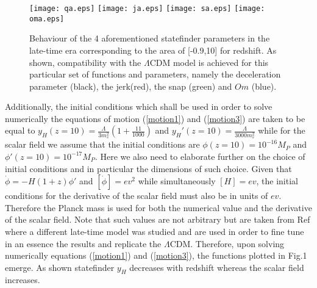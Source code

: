 \documentclass[aps,prd,twocolumn,groupedaddress,showpacs,nofootinbib,amssymb]{revtex4-2}
\begin{document}
\begin{figure}[h!]
\centering
\label{plot2}
\texttt{[image: qa.eps]}
\texttt{[image: ja.eps]}
\texttt{[image: sa.eps]}
\texttt{[image: oma.eps]}
\caption{Behaviour of the 4 aforementioned statefinder parameters in the late-time era corresponding to the area of [-0.9,10] for redshift. As shown, compatibility with the $\Lambda$CDM model is achieved for this particular set of functions and parameters, namely the deceleration parameter (black), the jerk(red), the snap (green) and $Om$ (blue).}
\end{figure}
Additionally, the initial conditions which shall be used in order to solve numerically the equations of motion (\ref{motion1}) and (\ref{motion3}) are taken to be equal to $y_H(z=10)=\frac{\Lambda}{3m_s^2}\left(1+\frac{11}{1000}\right)$ and $y_H'(z=10)=\frac{\Lambda}{3000m_s^2}$ while for the scalar field we assume that the initial conditions are $\phi(z=10)=10^{-16}M_P$ and $\phi'(z=10)=10^{-17}M_P$. Here we also need to elaborate further on the choice of initial conditions and in particular the dimensions of such choice. Given that $\dot\phi=-H(1+z)\phi'$ and $[\dot\phi]=ev^2$ while simultaneously $[H]=ev$, the initial conditions for the derivative of the scalar field must also be in units of $ev$. Therefore the Planck mass is used for both the numerical value and the derivative of the scalar field. Note that such values are not arbitrary but are taken from Ref\cite{Odintsov:2020qyw} where a different late-time model was studied and are used in order to fine tune in an essence the results and replicate the $\Lambda$CDM. Therefore, upon solving numerically equations (\ref{motion1}) and (\ref{motion3}), the functions plotted in Fig.1 emerge. As shown statefinder $y_H$ decreases with redshift whereas the scalar field increases. 
\end{document}
